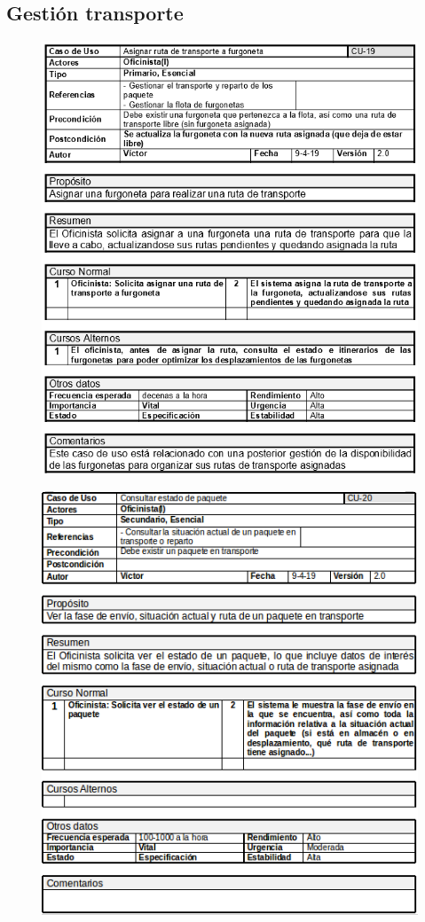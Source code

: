\subsection{Gestión transporte}
\begin{figure}[H]
	\centering
	\includegraphics[width=16cm]{19}
\end{figure}
\begin{figure}[H]
	\centering
	\includegraphics[width=16cm]{20}
\end{figure}
